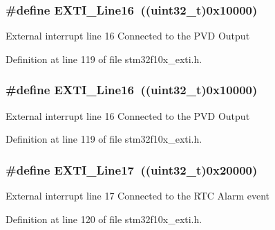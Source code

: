 \subsubsection[{\texorpdfstring{E\+X\+T\+I\+\_\+\+Line16}{EXTI_Line16}}]{\setlength{\rightskip}{0pt plus 5cm}\#define E\+X\+T\+I\+\_\+\+Line16~(({\bf uint32\+\_\+t})0x10000)}\hypertarget{group___e_x_t_i___lines_ga21326db7db8ca614c746b7f52dc45ead}{}\label{group___e_x_t_i___lines_ga21326db7db8ca614c746b7f52dc45ead}
External interrupt line 16 Connected to the P\+VD Output 

Definition at line 119 of file stm32f10x\+\_\+exti.\+h.

\subsubsection[{\texorpdfstring{E\+X\+T\+I\+\_\+\+Line16}{EXTI_Line16}}]{\setlength{\rightskip}{0pt plus 5cm}\#define E\+X\+T\+I\+\_\+\+Line16~(({\bf uint32\+\_\+t})0x10000)}\hypertarget{group___e_x_t_i___lines_ga21326db7db8ca614c746b7f52dc45ead}{}\label{group___e_x_t_i___lines_ga21326db7db8ca614c746b7f52dc45ead}
External interrupt line 16 Connected to the P\+VD Output 

Definition at line 119 of file stm32f10x\+\_\+exti.\+h.

\subsubsection[{\texorpdfstring{E\+X\+T\+I\+\_\+\+Line17}{EXTI_Line17}}]{\setlength{\rightskip}{0pt plus 5cm}\#define E\+X\+T\+I\+\_\+\+Line17~(({\bf uint32\+\_\+t})0x20000)}\hypertarget{group___e_x_t_i___lines_ga3e0fc18bc0722adc09605e3093b24c6a}{}\label{group___e_x_t_i___lines_ga3e0fc18bc0722adc09605e3093b24c6a}
External interrupt line 17 Connected to the R\+TC Alarm event 

Definition at line 120 of file stm32f10x\+\_\+exti.\+h.

